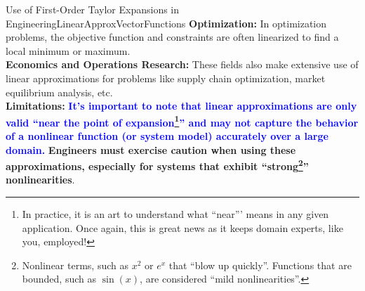 \begin{funColor}{Use of First-Order Taylor Expansions in Engineering}{LinearApproxVectorFunctions}
\textbf{Optimization:}
In optimization problems, the objective function and constraints are often linearized to find a local minimum or maximum.\\

\textbf{Economics and Operations Research:}
These fields also make extensive use of linear approximations for problems like supply chain optimization, market equilibrium analysis, etc. \\

\textbf{\large Limitations:} \textcolor{blue}{\bf \large It's important to note that linear approximations are only valid ``near the point of expansion\footnote{In practice, it is an art to understand what ``near''' means in any given application. Once again, this is great news as it keeps domain experts, like you, employed!}'' and may not capture the behavior of a nonlinear function (or system model) accurately over a large domain.} {\bf \Large Engineers must exercise caution when using these approximations, especially for systems that exhibit ``strong\footnote{Nonlinear terms, such as $x^2$ or $e^x$ that ``blow up quickly''. Functions that are bounded, such as $\sin(x)$, are considered ``mild nonlinearities''.}'' nonlinearities}. 
\end{funColor}

\vspace*{.2cm}

